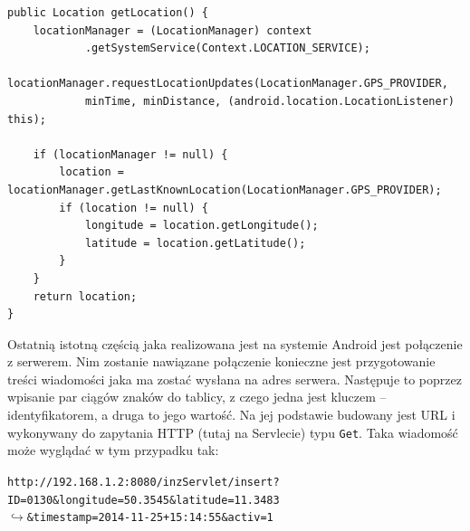 \documentclass[eng,printmode,oneside]{mgr}
\begin{document}
\begin{lstlisting}[caption=Pobieranie lokalizacji
kuriera metoda getLocation() z klasy GpsTrack,label=lst:GpsTrack.java]
public Location getLocation() {
	locationManager = (LocationManager) context
			.getSystemService(Context.LOCATION_SERVICE);
	locationManager.requestLocationUpdates(LocationManager.GPS_PROVIDER,
			minTime, minDistance, (android.location.LocationListener) this);
			
	if (locationManager != null) {
		location = locationManager.getLastKnownLocation(LocationManager.GPS_PROVIDER);
		if (location != null) {
			longitude = location.getLongitude();
			latitude = location.getLatitude();
		}
	}
	return location;
}
\end{lstlisting}

Ostatnią istotną częścią jaka realizowana jest na systemie Android jest połączenie
z serwerem. Nim zostanie nawiązane połączenie konieczne jest przygotowanie
treści wiadomości jaka ma zostać wysłana na adres serwera. Następuje to poprzez
wpisanie par ciągów znaków do tablicy, z czego jedna jest kluczem -- identyfikatorem,
a druga to jego wartość. Na jej podstawie budowany jest URL i wykonywany do zapytania
 HTTP (tutaj na Servlecie) typu
\texttt{Get}. Taka wiadomość może wyglądać w tym przypadku tak:

\begin{flushright}
\texttt{http://192.168.1.2:8080/inzServlet/insert?ID=0130\&longitude=50.3545\&latitude=11.3483
\\$\hookrightarrow$\&timestamp=2014-11-25+15:14:55\&activ=1}
\end{flushright}
\end{document}
